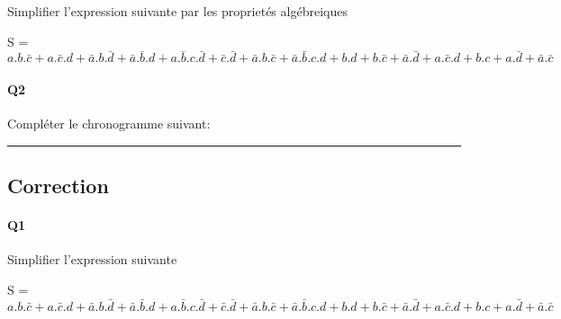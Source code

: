 Simplifier l'expression suivante par les proprietés algébreiques 

S = $ a.b.\bar c + a.\bar c.d + \bar a.b.\bar d + \bar a.\bar b.d + a.\bar b.c.\bar d  +  \bar c.\bar d + \bar a.b.\bar c + \bar a.\bar b.c.d  +  b.d + b.\bar c + \bar a.\bar d + a.\bar c.d  +  b.c + a.\bar d + \bar a.\bar c $


\paragraph{Q2}

Compléter le chronogramme suivant:

 





\hrule width 1\linewidth
\pagebreak

\subsection{Correction}


\paragraph{Q1}

Simplifier l'expression suivante

S = $ a.b.\bar c + a.\bar c.d + \bar a.b.\bar d + \bar a.\bar b.d + a.\bar b.c.\bar d  +  \bar c.\bar d + \bar a.b.\bar c + \bar a.\bar b.c.d  +  b.d + b.\bar c + \bar a.\bar d + a.\bar c.d  +  b.c + a.\bar d + \bar a.\bar c $

